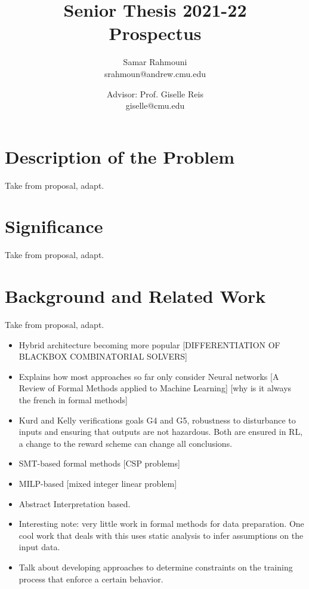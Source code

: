 \documentclass[a4paper,11pt]{article}
\author{%
  \begin{minipage}[t]{0.47\textwidth}
    \centering
    Samar Rahmouni \\ srahmoun@andrew.cmu.edu
  \end{minipage}
  \and
  \begin{minipage}[t]{0.45\textwidth}
    \centering
    Advisor: Prof. Giselle Reis \\ giselle@cmu.edu
  \end{minipage}%
  \vspace*{2ex}
}
\date{}
\title{{\Large\sc Senior Thesis 2021-22\\[2ex]}{\LARGE\bf Prospectus\vspace*{3ex}}}
\begin{document}
\maketitle 

\section{Description of the Problem}
Take from proposal, adapt. 

\section{Significance}
Take from proposal, adapt. 


\section{Background and Related Work}
Take from proposal, adapt.
\begin{itemize}
  \item Hybrid architecture becoming more popular [DIFFERENTIATION OF BLACKBOX COMBINATORIAL SOLVERS]
  \item Explains how most approaches so far only consider Neural networks 
  [A Review of Formal Methods applied to Machine Learning] [why is it always the french in formal methods]
  \item Kurd and Kelly verifications goals G4 and G5, robustness to disturbance to inputs and ensuring that outputs are not hazardous. 
        Both are ensured in RL, a change to the reward scheme can change all conclusions. 
  \item SMT-based formal methods [CSP problems]
  \item MILP-based [mixed integer linear problem]
  \item Abstract Interpretation based. 
  \item Interesting note: very little work in formal methods for data preparation. One cool work that deals with this 
        uses static analysis to infer assumptions on the input data. 
  \item Talk about developing approaches to determine constraints on the training process that enforce a certain behavior. 
\end{itemize}
\end{document}
